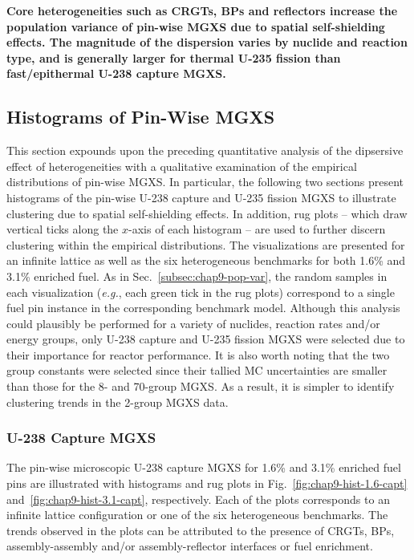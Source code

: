 \begin{emphbox}
\textbf{Core heterogeneities such as \acp{CRGT}, \acp{BP} and reflectors increase the population variance of pin-wise \ac{MGXS} due to spatial self-shielding effects. The magnitude of the dispersion varies by nuclide and reaction type, and is generally larger for thermal U-235 fission than fast/epithermal U-238 capture \ac{MGXS}.}
\end{emphbox}

\subsection{Histograms of Pin-Wise MGXS}
\label{subsec:chap9-histograms}

This section expounds upon the preceding quantitative analysis of the dipsersive effect of heterogeneities with a qualitative examination of the empirical distributions of pin-wise \ac{MGXS}. In particular, the following two sections present histograms of the pin-wise U-238 capture and U-235 fission \ac{MGXS} to illustrate clustering due to spatial self-shielding effects. In addition, rug plots -- which draw vertical ticks along the $x$-axis of each histogram -- are used to further discern clustering within the empirical distributions. The visualizations are presented for an infinite lattice as well as the six heterogeneous benchmarks for both 1.6\% and 3.1\% enriched fuel. As in Sec.~\ref{subsec:chap9-pop-var}, the random samples in each visualization (\textit{e.g.}, each green tick in the rug plots) correspond to a single fuel pin instance in the corresponding benchmark model. Although this analysis could plausibly be performed for a variety of nuclides, reaction rates and/or energy groups, only U-238 capture and U-235 fission \ac{MGXS} were selected due to their importance for reactor performance. It is also worth noting that the two group constants were selected since their tallied \ac{MC} uncertainties are smaller than those for the 8- and 70-group \ac{MGXS}. As a result, it is simpler to identify clustering trends in the 2-group \ac{MGXS} data.

\subsubsection{U-238 Capture MGXS}
\label{subsubsec:chap9-histograms-capt}

The pin-wise microscopic U-238 capture \ac{MGXS} for 1.6\% and 3.1\% enriched fuel pins are illustrated with histograms and rug plots in Fig.~\ref{fig:chap9-hist-1.6-capt} and~\ref{fig:chap9-hist-3.1-capt}, respectively. Each of the plots corresponds to an infinite lattice configuration or one of the six heterogeneous benchmarks. The trends observed in the plots can be attributed to the presence of \acp{CRGT}, \acp{BP}, assembly-assembly and/or assembly-reflector interfaces or fuel enrichment. 

